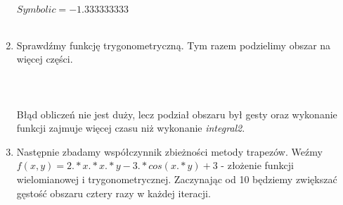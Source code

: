 \documentclass{article}
\begin{document}
\begin{enumerate}
{{		$Symbolic = -1.333333333$
    }
}\\\\
\item Sprawdźmy funkcję trygonometryczną. Tym razem podzielimy obszar na więcej części.\\\\
\noindent{}\\\\
Błąd obliczeń nie jest duży, lecz podział obszaru był gesty oraz wykonanie funkcji zajmuje więcej czasu niż wykonanie \textit{integral2}.
\item Następnie zbadamy współczynnik zbieżności metody trapezów. Weźmy $f(x,y)= 2 .* x .* x .* y - 3.*cos(x.*y) + 3$ - złożenie funkcji wielomianowej i trygonometrycznej. Zaczynając od 10 będziemy zwiększać gęstość obszaru cztery razy w każdej iteracji.\\\\
\noindent{}\\\\
\noindent{}
\end{enumerate}
\end{document}

